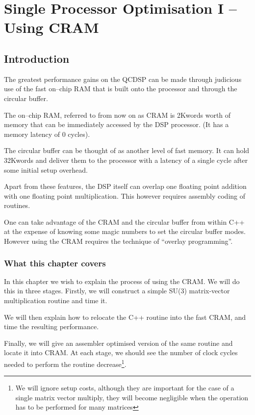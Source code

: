 \chapter{Single Processor Optimisation I -- Using CRAM}
\section{Introduction}
The greatest performance gains on the QCDSP can be made through
judicious use of the fast on--chip RAM that is built onto the 
processor and through the circular buffer.

The on--chip RAM, referred to from now on as CRAM is 2Kwords
worth of memory that can be immediately accessed
by the DSP processor. (It has a memory latency of 0 cycles).
 
The circular buffer can be thought of as another level of fast
memory. It can hold 32Kwords and deliver them to the processor
with a latency of a single cycle after some initial setup overhead.

Apart from these features, the DSP itself can overlap one floating
point addition with one floating point multiplication. This however
requires assembly coding of routines. 

One can take advantage of the CRAM and the circular buffer
from within C++ at the expense of knowing some magic numbers to set
the circular buffer modes. However using the CRAM requires the 
technique of ``overlay programming''.

\subsection{What this chapter covers}
In this chapter we wish to explain the process of using the CRAM.
We will do this in three stages. Firstly, we will construct a 
simple SU(3) matrix-vector multiplication routine and time it.

We will then explain how to relocate the C++ routine into the fast
CRAM, and time the resulting performance.

Finally, we will give an assembler optimised version of the same
routine and locate it into CRAM. At each stage, we should see the
number of clock cycles needed to perform the routine decrease\footnote{We will
ignore setup costs, although they are important for the case of a single
matrix vector multiply, they will become negligible when the operation
has to be performed for many matrices}. 

